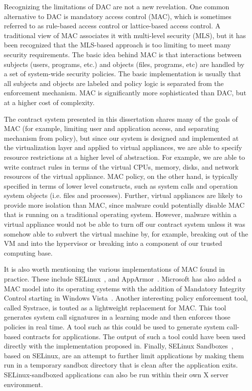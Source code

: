 Recognizing the limitations of DAC are not a new revelation. One common alternative to DAC is mandatory access control (MAC), which is sometimes referred to as rule-based access control\cite{lindqvist_mac_2006} or lattice-based access control\cite{denning_mac_1976}. A traditional view of MAC associates it with multi-level security (MLS), but it has been recognized that the MLS-based approach is too limiting to meet many security requirements\cite{loscocco_2001}. The basic idea behind MAC is that interactions between subjects (users, programs, etc.) and objects (files, programs, etc) are handled by a set of system-wide security policies. The basic implementation is usually that all subjects and objects are labeled and policy logic is separated from the enforcement mechanism. MAC is significantly more sophisticated than DAC, but at a higher cost of complexity. 

The contract system presented in this dissertation shares many of the goals of MAC (for example, limiting user and application access, and separating mechanism from policy), but since our system is designed and implemented at the virtualization layer and applied to virtual appliances, we are able to specify resource restrictions at a higher level of abstraction. For example, we are able to write contract rules in terms of the virtual CPUs, memory, disks, and network resources of the virtual appliance. MAC policy, on the other hand, is typically specified in terms of lower level constructs, such as system calls and operation system objects (i.e. files and processes). Further, virtual appliances are likely to provide more isolation than MAC, since malware could potentially disable MAC that is running on a traditional operating system. However, malware within a virtual appliance would not be able to turn off our contract system unless it was somehow able to subvert the virtual machine by, for example, breaking out of the VM and into the hypervisor or breaking into a component of our trusted computing base. 

It is also worth mentioning the various implementations of MAC found in practice. These include SELinux~\cite{smalley_2001, loscocco_2001}, and AppArmor~\cite{AppArmor_2006}. Microsoft has also added a MAC model into its operating systems with the addition of Mandatory Integrity Control starting in Windows Vista~\cite{windows_integrity_mechanism, mandatory_integrity_control}. Another interesting policy enforcement tool, called Systrace\cite{provos_2003}, is touted as a lightweight replacement for MAC. This tool generates system call signatures in a learning mode and then enforces those policies in real time. A tool such as this could be used to generate system call-based contracts for applications. The output of such a tool could have been used directly with the implementation proposed in\cite{evanchik_thesis_2004}. Finally, SELinux Sandboxes~\cite{selinux_sandboxes_walsh_2009, selinux_sandboxes_morris_2009}, based on SELinux, are an attempt to further limit applications by making them run in a temporary sandbox directory that is clean after the application exits. SELinux-sandboxed applications can also be run within their own X server environment. 

